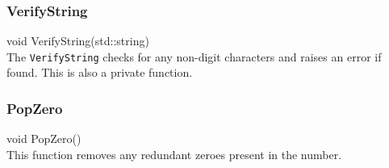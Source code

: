 \subsubsection{VerifyString}
{\ttfamily \large void VerifyString(std::string)} \\[2mm]
The \verb|VerifyString| checks for any non-digit characters and raises an error if found. This is also a private function.

\subsubsection{PopZero}
{\ttfamily \large void PopZero()} \\[2mm]
This function removes any redundant zeroes present in the number.

